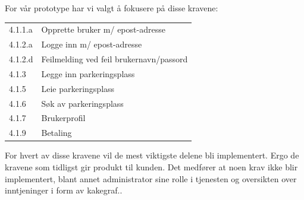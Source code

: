 For vår prototype har vi valgt å fokusere på disse kravene:
\begin{table}[H]
\begin{tabular}{ll}
4.1.1.a & Opprette bruker m/ epost-adresse        \\
4.1.2.a & Logge inn m/ epost-adresse              \\
4.1.2.d & Feilmelding ved feil brukernavn/passord \\
4.1.3  & Legge inn parkeringsplass               \\
4.1.5  & Leie parkeringsplass                    \\
4.1.6  & Søk av parkeringsplass                  \\
4.1.7  & Brukerprofil                            \\
4.1.9  & Betaling                               
\end{tabular}
\end{table}
\vspace{-1em}
For hvert av disse kravene vil de mest viktigste delene bli implementert. Ergo de kravene som tidligst gir produkt til kunden. Det medfører at noen krav ikke blir implementert, blant annet administrator sine rolle i tjenesten og oversikten over inntjeninger i form av kakegraf.. 

